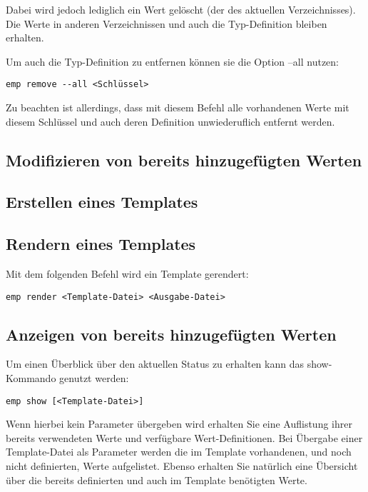 Dabei wird jedoch lediglich ein Wert gelöscht (der des aktuellen Verzeichnisses). Die Werte in anderen Verzeichnissen und auch die Typ-Definition bleiben erhalten.

Um auch die Typ-Definition zu entfernen können sie die Option --all nutzen:
\begin{verbatim}
emp remove --all <Schlüssel>
\end{verbatim}
Zu beachten ist allerdings, dass mit diesem Befehl alle vorhandenen Werte mit diesem Schlüssel und auch deren Definition unwiederuflich entfernt werden.

\subsection{Modifizieren von bereits hinzugefügten Werten}
\subsection{Erstellen eines Templates}
\subsection{Rendern eines Templates}
Mit dem folgenden Befehl wird ein Template gerendert:
\begin{verbatim}
emp render <Template-Datei> <Ausgabe-Datei>
\end{verbatim}

\subsection{Anzeigen von bereits hinzugefügten Werten}
Um einen Überblick über den aktuellen Status zu erhalten kann das show-Kommando genutzt werden:
\begin{verbatim}
emp show [<Template-Datei>]
\end{verbatim}
Wenn hierbei kein Parameter übergeben wird erhalten Sie eine Auflistung ihrer bereits verwendeten Werte und verfügbare Wert-Definitionen.
Bei Übergabe einer Template-Datei als Parameter werden die im Template vorhandenen, und noch nicht definierten, Werte aufgelistet. Ebenso erhalten Sie natürlich eine Übersicht über die bereits definierten und auch im Template benötigten Werte.
